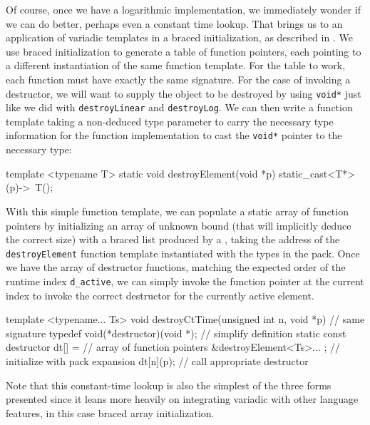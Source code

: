 Of course, once we have a logarithmic implementation, we immediately
wonder if we can do better, perhaps even a constant time lookup. That
brings us to an application of variadic templates in a braced
initialization, as described in . We use braced
initialization to generate a table of function pointers, each pointing
to a different instantiation of the same function template. For the
table to work, each function must have exactly the same signature. For
the case of invoking a destructor, we will want to supply the object to
be destroyed by using \lstinline!void*! just like we did with
\lstinline!destroyLinear! and \lstinline!destroyLog!. We can then write a
function template taking a non-deduced type parameter to carry the
necessary type information for the function implementation to cast the
\lstinline!void*! pointer to the necessary type:

\begin{emcppslisting}[emcppsbatch={e38,e39}]
template <typename T>
static void destroyElement(void *p)
{
    static_cast<T*>(p)->~T();
}
\end{emcppslisting}
    

\noindent With this simple function template, we can populate a static array of
function pointers by initializing an array of unknown bound (that will
implicitly deduce the correct size) with a braced list produced by a
, taking the address of the
\lstinline!destroyElement! function template instantiated with the types in
the pack. Once we have the array of destructor functions, matching the
expected order of the runtime index \lstinline!d_active!, we can simply
invoke the function pointer at the current index to invoke the correct
destructor for the currently active element.

\begin{emcppslisting}[emcppsbatch={e38,e39}]
template <typename... Ts>
void destroyCtTime(unsigned int n, void *p)  // same signature
{
    typedef void(*destructor)(void *);       // simplify definition
    static const destructor dt[] =           // array of function pointers
        { &destroyElement<Ts>... };          // initialize with pack expansion
    dt[n](p);                                // call appropriate destructor
}
\end{emcppslisting}
    

\noindent Note that this constant-time lookup is also the simplest of the three
forms presented since it leans more heavily on integrating variadic
 with other language features, in this case
braced array initialization.

